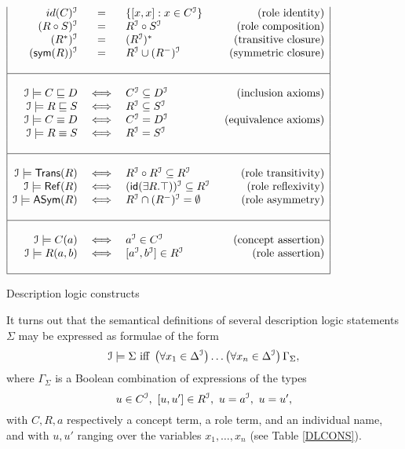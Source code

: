 \documentclass[a4paper,UKenglish]{lipics}
\newcommand{\istransitive}[1]{\mathsf{Trans}(#1)}
\newcommand{\isreflexive}[1]{\mathsf{Ref}(#1)}
\newcommand{\isantisymmetric}[1]{\mathsf{ASym}(#1)}
\newcommand{\symmetricclosure}[1]{\mathsf{sym}(#1)}
\newcommand{\roleidentity}[1]{\mathsf{id}(#1)}
\begin{document}
\begin{table}
\begin{math}
\begin{array}{|rclr|}
id(C)^{\I} & = & \{ [x,x] : x \in C^{\I} \} & \mbox{ (role identity)}\\
(R \circ S)^{\I} & = & R^{\I} \circ S^{\I} & \mbox{ (role composition)}\\
(R^{*})^{\I} & = & (R^{\I})^{*} & \mbox{ (transitive closure)}\\
(\symmetricclosure{R})^{\I} & = & R^{\I} \cup (R^{-})^{\I} & \mbox{ (symmetric closure)}\\
&&&\\
\hline
&&&\\
\I \models C \Issub D & \iff & C^{\I} \subseteq D^{\I} & \mbox{ (inclusion axioms)}\\
\I \models R \Issub S & \iff & R^{\I} \subseteq S^{\I}&\\
\I \models C \equiv D & \iff & C^{\I} = D^{\I}& \mbox{ (equivalence axioms)}\\
\I \models R \equiv S & \iff & R^{\I} = S^{\I}&\\
&&&\\
\hline
&&&\\
\I \models \istransitive{R} & \iff & R^{\I} \circ R^{\I} \subseteq R^{\I}&\mbox{ (role transitivity)}\\
\I \models \isreflexive{R} & \iff & (\roleidentity{\exists R.\top})^{\I} \subseteq R^{\I} & \mbox{ (role reflexivity)}\\
\I \models \isantisymmetric{R} & \iff & R^{\I} \cap (R^{-})^{\I} = \emptyset & \mbox{ (role asymmetry)}\\
&&&\\
\hline
&&&\\
\I \models C(a) & \iff & a^{\I} \in C^{\I}& \mbox{ (concept assertion)}\\
\I \models R(a,b) & \iff & [a^{\I}, b^{\I}] \in R^{\I}& \mbox{ (role assertion)}\\
&&&\\
\hline
\end{array}
\end{math}
\caption{Description logic constructs}\label{DLCONS}
\end{table}


It turns out that the semantical definitions
of several description logic statements $\Sigma$ may be expressed as formulae of
the form
\[
 \mathcal{I} \models \Sigma \mbox{ iff } \left(\forall x_1 \in \Delta^{\mathcal{I}}\right)
  \ldots \left(\forall x_n \in \Delta^{\mathcal{I}}\right)\Gamma_\Sigma,
\]
where $\Gamma_\Sigma$ is a Boolean combination of expressions of the types
\[
u \in C^{\mathcal{I}},~ [u,u'] \in R^{\mathcal{I}},~ u=a^{\mathcal{I}},~ u=u',
\]
with $C,R,a$ respectively a concept term, a role term, and an
individual name, and with $u,u'$ ranging over the variables $x_1,
\ldots, x_n$ (see Table \ref{DLCONS}).
\end{document}

